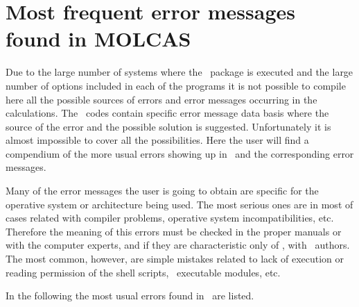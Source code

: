 \section{Most frequent error messages found in MOLCAS}


Due to the large number of systems where the \molcas\ package is
executed and the large number of options included in each of
the programs it is not possible to compile here all the possible
sources of errors and error messages occurring in the calculations.
The \molcas\ codes contain specific error message data basis where
the source of the error and the possible solution is suggested.
Unfortunately it is almost impossible to cover all the possibilities.
Here the user will find a compendium of the more usual errors
showing up in \molcas\ and the corresponding error messages.

Many of the error messages the user is going to obtain are specific
for the operative system or architecture being used. 
The most serious ones are in most of cases 
related with compiler problems, operative system incompatibilities,
etc. Therefore the meaning of this errors must be checked in the proper 
manuals or with the computer experts, and if they are characteristic
only of \molcas, with \molcas\ authors. The most common, however,
are simple mistakes related to lack of execution or reading
permission of the shell scripts, \molcas\ executable modules, etc.

In the following the most usual errors found in \molcas\ are listed.

